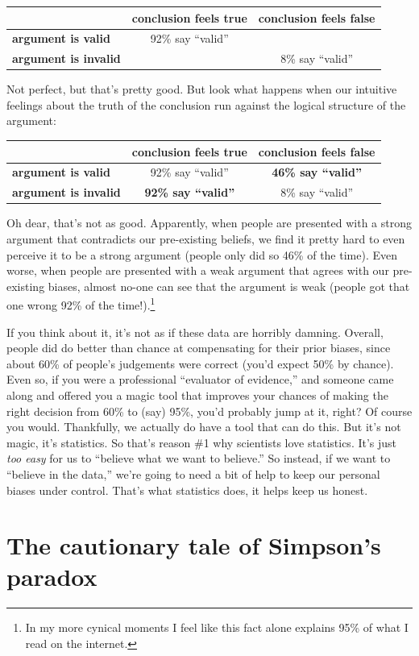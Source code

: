 \documentclass[
]{book}
\begin{document}
\begin{longtable}[]{@{}lcc@{}}
\toprule
& conclusion feels true & conclusion feels false\tabularnewline
\midrule
\endhead
\textbf{argument is valid} & 92\% say ``valid'' &\tabularnewline
\textbf{argument is invalid} & & 8\% say ``valid''\tabularnewline
\bottomrule
\end{longtable}

Not perfect, but that's pretty good. But look what happens when our intuitive feelings about the truth of the conclusion run against the logical structure of the argument:

\begin{longtable}[]{@{}lcc@{}}
\toprule
& conclusion feels true & conclusion feels false\tabularnewline
\midrule
\endhead
\textbf{argument is valid} & 92\% say ``valid'' & \textbf{46\% say ``valid''}\tabularnewline
\textbf{argument is invalid} & \textbf{92\% say ``valid''} & 8\% say ``valid''\tabularnewline
\bottomrule
\end{longtable}

Oh dear, that's not as good. Apparently, when people are presented with a strong argument that contradicts our pre-existing beliefs, we find it pretty hard to even perceive it to be a strong argument (people only did so 46\% of the time). Even worse, when people are presented with a weak argument that agrees with our pre-existing biases, almost no-one can see that the argument is weak (people got that one wrong 92\% of the time!).\footnote{In my more cynical moments I feel like this fact alone explains 95\% of what I read on the internet.}

If you think about it, it's not as if these data are horribly damning. Overall, people did do better than chance at compensating for their prior biases, since about 60\% of people's judgements were correct (you'd expect 50\% by chance). Even so, if you were a professional ``evaluator of evidence,'' and someone came along and offered you a magic tool that improves your chances of making the right decision from 60\% to (say) 95\%, you'd probably jump at it, right? Of course you would. Thankfully, we actually do have a tool that can do this. But it's not magic, it's statistics. So that's reason \#1 why scientists love statistics. It's just \emph{too easy} for us to ``believe what we want to believe.'' So instead, if we want to ``believe in the data,'' we're going to need a bit of help to keep our personal biases under control. That's what statistics does, it helps keep us honest.

\hypertarget{the-cautionary-tale-of-simpsons-paradox}{%
\section{The cautionary tale of Simpson's paradox}\label{the-cautionary-tale-of-simpsons-paradox}}
\end{document}
